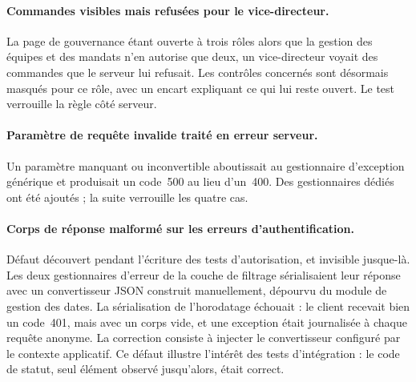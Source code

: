 \paragraph{Commandes visibles mais refusées pour le vice-directeur.} La page de gouvernance
étant ouverte à trois rôles alors que la gestion des équipes et des mandats n'en autorise
que deux, un vice-directeur voyait des commandes que le serveur lui refusait. Les contrôles
concernés sont désormais masqués pour ce rôle, avec un encart expliquant ce qui lui reste
ouvert. Le test  verrouille la règle côté serveur.

\paragraph{Paramètre de requête invalide traité en erreur serveur.} Un paramètre manquant
ou inconvertible aboutissait au gestionnaire d'exception générique et produisait un
code~500 au lieu d'un~400. Des gestionnaires dédiés ont été ajoutés ; la suite
 verrouille les quatre cas.

\paragraph{Corps de réponse malformé sur les erreurs d'authentification.} Défaut découvert
pendant l'écriture des tests d'autorisation, et invisible jusque-là. Les deux gestionnaires
d'erreur de la couche de filtrage sérialisaient leur réponse avec un convertisseur JSON
construit manuellement, dépourvu du module de gestion des dates. La sérialisation de
l'horodatage échouait : le client recevait bien un code~401, mais avec un corps vide, et
une exception était journalisée à chaque requête anonyme. La correction consiste à injecter
le convertisseur configuré par le contexte applicatif. Ce défaut illustre l'intérêt des
tests d'intégration : le code de statut, seul élément observé jusqu'alors, était correct.

